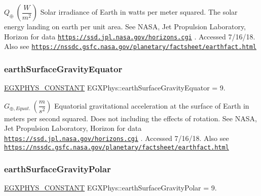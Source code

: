 $ Q_{\oplus} \ (\dfrac{W}{m^2})$ Solar irradiance of Earth in watts per meter squared. The solar energy landing on earth per unit area. See N\+A\+SA, Jet Propulsion Laboratory, Horizon for data \href{https://ssd.jpl.nasa.gov/horizons.cgi}{\tt https\+://ssd.\+jpl.\+nasa.\+gov/horizons.\+cgi} . Accessed 7/16/18. Also see \href{https://nssdc.gsfc.nasa.gov/planetary/factsheet/earthfact.html}{\tt https\+://nssdc.\+gsfc.\+nasa.\+gov/planetary/factsheet/earthfact.\+html} \mbox{\label{group___e_g_x_phys-_constants-_astrophysics-_solar_system-_earth-_bulk_ga16734192d073e46f32dc0e296b2f99a6}} 
\subsubsection{\texorpdfstring{earth\+Surface\+Gravity\+Equator}{earthSurfaceGravityEquator}}
{\footnotesize\ttfamily \mbox{\hyperlink{group___e_g_x_phys-_constants-_macros_ga76980d288494ce1714c9ac68a95ba702}{E\+G\+X\+P\+H\+Y\+S\+\_\+\+C\+O\+N\+S\+T\+A\+NT}} E\+G\+X\+Phys\+::earth\+Surface\+Gravity\+Equator = 9.}

$ G_{\oplus,Equat.} \ (\dfrac{m}{s^2})$ Equatorial gravitational acceleration at the surface of Earth in meters per second squared. Does not including the effects of rotation. See N\+A\+SA, Jet Propulsion Laboratory, Horizon for data \href{https://ssd.jpl.nasa.gov/horizons.cgi}{\tt https\+://ssd.\+jpl.\+nasa.\+gov/horizons.\+cgi} . Accessed 7/16/18. Also see \href{https://nssdc.gsfc.nasa.gov/planetary/factsheet/earthfact.html}{\tt https\+://nssdc.\+gsfc.\+nasa.\+gov/planetary/factsheet/earthfact.\+html} \mbox{\label{group___e_g_x_phys-_constants-_astrophysics-_solar_system-_earth-_bulk_ga874fc1db4f316a31102432881fd60ab3}} 
\subsubsection{\texorpdfstring{earth\+Surface\+Gravity\+Polar}{earthSurfaceGravityPolar}}
{\footnotesize\ttfamily \mbox{\hyperlink{group___e_g_x_phys-_constants-_macros_ga76980d288494ce1714c9ac68a95ba702}{E\+G\+X\+P\+H\+Y\+S\+\_\+\+C\+O\+N\+S\+T\+A\+NT}} E\+G\+X\+Phys\+::earth\+Surface\+Gravity\+Polar = 9.}

